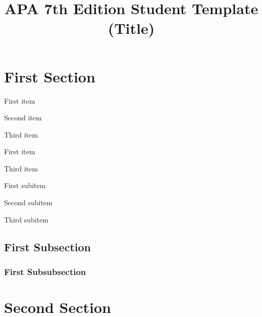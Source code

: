 \documentclass[
  stu,
  12pt,
  babel,
  english,
  floatsintext,
]{apa7}
\title{APA 7th Edition Student Template (Title)}
\begin{document}
\maketitle

\section{First Section}
\lipsum[1]

\begin{APAenumerate}
	\item First item
	\item Second item
	\item Third item
\end{APAenumerate}

\lipsum[2]

\begin{APAitemize}
	\item First item
	\item \lipsum[2]
	\item Third item
	\begin{APAitemize}
		\item First subitem
		\item Second subitem
		\item Third subitem
	\end{APAitemize}
\end{APAitemize}

\subsection{First Subsection}
\lipsum[2]

\subsubsection{First Subsubsection}
\lipsum[3]

\section{Second Section}
\lipsum[4]
\end{document}
